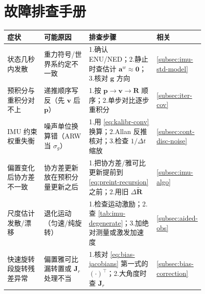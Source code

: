 \section*{故障排查手册}
\begin{table}[H]\centering\small
\begin{tabular}{p{0.20\linewidth}p{0.24\linewidth}p{0.36\linewidth}l}
\toprule
症状 & 可能原因 & 排查步骤 & 相关 \\
\midrule
状态几秒内发散 & 重力符号/世界系约定不一致 & 1.确认 ENU/NED；2.静止时查估计 $\mathbf a^w\approx\mathbf 0$；3.核对 $\mathbf g$ 方向 & \cref{subsec:imu-std-model} \\
预积分与重积分对不上 & 递推顺序写反（先 $\mathbf v$ 后 $\mathbf p$） & 1.按 $\mathbf p\to\mathbf v\to\mathbf R$ 顺序；2.单步对比逐步重积分 & \cref{subsec:iter-cov} \\
IMU 约束权重失衡 & 噪声单位换算错（ARW 当 $\sigma_g$） & 1.用 \cref{eq:kalibr-conv} 换算；2.Allan 反推核对；3.检查 $1/\Delta t$ 缩放 & \cref{subsec:cont-disc-noise} \\
偏置变化后协方差不一致 & 协方差更新放在预积分量更新之后 & 1.把协方差/雅可比更新提前到 \cref{eq:preint-recursion} 之前；2.用旧 $\Delta\tilde{\mathbf R}$ & \cref{subsec:imu-algo} \\
尺度估计发散/漂移 & 退化运动（匀速/纯旋转） & 1.检查运动激励；2.查 \cref{tab:imu-degenerate}；3.加绝对测量或激发加速度 & \cref{subsec:aided-obs} \\
快速旋转段旋转残差异常 & 偏置雅可比漏转置或 $\mathbf J_r$ 处理不当 & 1.核对 \cref{eq:bias-jacobians} 第一式的 $(\cdot)^\top$；2.大角度时查 $\mathbf J_r$ & \cref{subsec:bias-correction} \\
\bottomrule
\end{tabular}
\end{table}

